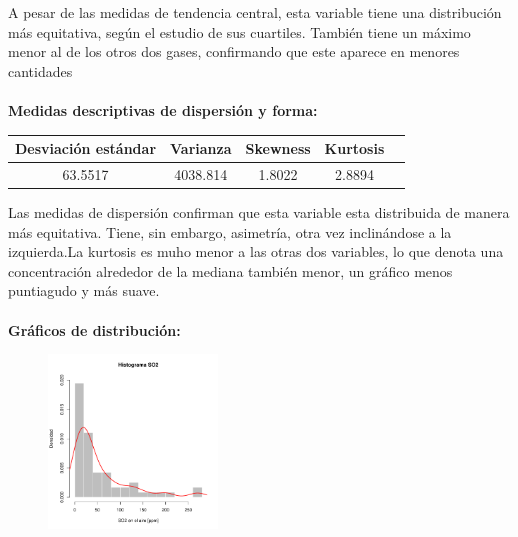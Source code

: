 \documentclass[11pt]{article}
\begin{document}
A pesar de las medidas de tendencia central, esta variable tiene una distribución más equitativa, según el estudio de sus cuartiles. También tiene un máximo menor al de los otros dos gases, confirmando que este aparece en menores cantidades
\\
\\
\textbf{Medidas descriptivas de dispersión y forma:}

\begin{center}
\begin{tabular}{|c|c|c|c|c|}
    \hline
    Desviación estándar  & Varianza & Skewness & Kurtosis\\ \hline
    63.5517 & 4038.814 & 1.8022 & 2.8894\\
    \hline
\end{tabular}
\end{center}

Las medidas de dispersión confirman que esta variable esta distribuida de manera más equitativa. Tiene, sin embargo, asimetría, otra vez inclinándose a la izquierda.La kurtosis es muho menor a las otras dos variables, lo que denota una concentración alrededor de la mediana también menor, un gráfico menos puntiagudo y más suave.
\\
\\
\textbf{Gráficos de distribución:}
\\

\begin{figure}
    \centering
    \includegraphics[width = 0.4\textwidth]{histso2}
\end{figure}
\end{document}
